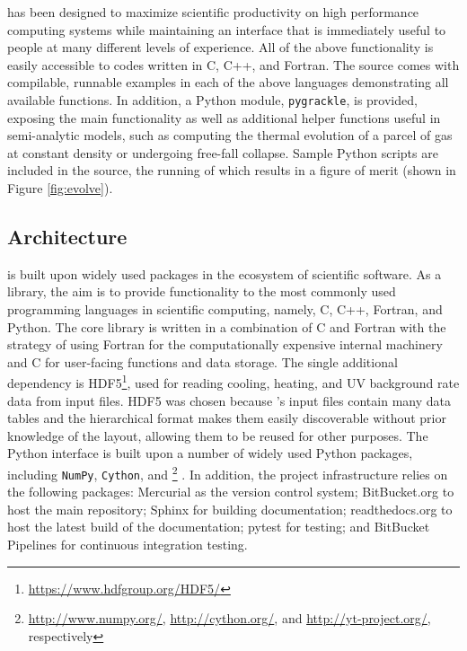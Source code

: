 \grackle{} has been designed to maximize scientific productivity on
high performance computing systems while maintaining an interface that
is immediately useful to people at many different levels of
experience.
All of the above functionality is easily accessible to codes written
in C, C++, and Fortran.  The \grackle{} source comes with compilable,
runnable examples in each of the above languages demonstrating all
available functions.  In addition, a Python module, \texttt{pygrackle},
is provided, exposing the main functionality as well as additional helper
functions useful in semi-analytic models, such as computing the
thermal evolution of a parcel of gas at constant density or undergoing
free-fall collapse.  Sample Python scripts are included in the source,
the running of which results in a figure of merit (shown in Figure
\ref{fig:evolve}).

\subsection{\grackle{} Architecture}

\grackle{} is built upon widely used packages in the ecosystem of
scientific software.  As a library, the aim is to provide
functionality to the most commonly used programming languages in
scientific computing, namely, C, C++, Fortran, and Python.  The core
library is written in a combination of C and Fortran with the strategy
of using Fortran for the computationally expensive internal machinery
and C for user-facing functions and data storage.  The single
additional dependency is
HDF5\footnote{\url{https://www.hdfgroup.org/HDF5/}}, used for reading
cooling, heating,
and UV background rate data from input files.  HDF5 was chosen because
\grackle{}'s input files contain many data tables and the hierarchical
format makes them easily discoverable without prior knowledge of the
layout, allowing them to be reused for other purposes.  The Python
interface is built upon a number of widely used Python packages, including
\texttt{NumPy}, \texttt{Cython}, and
\yt{}\footnote{\url{http://www.numpy.org/}, \url{http://cython.org/},
  and \url{http://yt-project.org/}, respectively} \citep[][an SI2-funded
project]{2011ApJS..192....9T}.  In
addition, the project infrastructure relies on the following packages:
Mercurial as the version control system; BitBucket.org to host the
main repository; Sphinx for building documentation; readthedocs.org to
host the latest build of the documentation; pytest for testing; and BitBucket
Pipelines for continuous integration testing.

